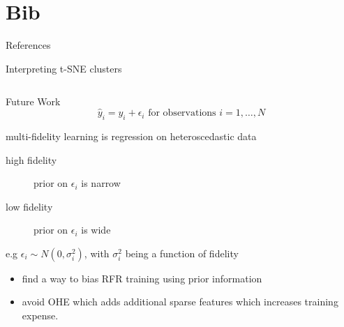 \documentclass[10pt, aspectratio=169, presentation]{beamer}
\begin{document}
\section{Bib}
\label{sec:org8d1a04b}
\begin{frame}[allowframebreaks]{References}
\AtNextBibliography{\tiny}
\printbibliography
\end{frame}
\appendix
\begin{frame}[label={sec:orgdff3e15}]{Interpreting t-SNE clusters}
\begin{columns}
\begin{column}{0.5\columnwidth}
 
\begin{center}

\end{center}
\end{column}

\begin{column}{0.5\columnwidth}
 
\begin{center}

\end{center}
\end{column}
\end{columns}
\end{frame}

\begin{frame}[label={sec:org2d1c8fe}]{Future Work}
\[
\hat{y}_i = y_i + \epsilon_i \mbox{ for observations } i=1,…,N
\]

multi-fidelity learning \alert{is} regression on heteroscedastic data

\begin{description}
\item[{high fidelity}] prior on \(\epsilon_i\) is narrow
\item[{low fidelity}] prior on \(\epsilon_i\) is wide
\end{description}

e.g \(\epsilon_i \sim N(0,\sigma_i^2)\), with \(\sigma_i^2\) being a function of fidelity

\begin{itemize}
\item find a way to bias RFR training using prior information
\item avoid OHE which adds additional sparse features which increases training expense.
\end{itemize}
\end{frame}
\end{document}
